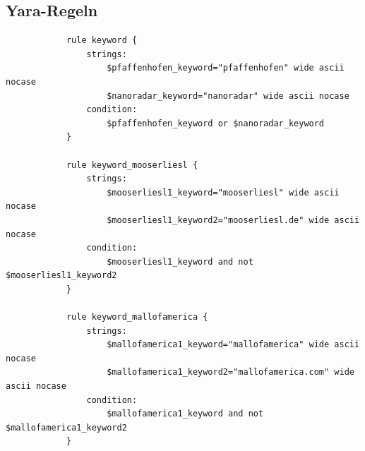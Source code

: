 
\begin{appendices}
		

%		

\renewcommand{\thesection}{\Alph{section}}

\begin{landscape}%
	\section{Yara-Regeln}
	\label{appendix:yara-regeln}
	\setcounter{page}{43}
	\vspace*{-0.5cm}
\begin{multicols}{2}
		\begin{verbatim}
			rule keyword {
				strings:
					$pfaffenhofen_keyword="pfaffenhofen" wide ascii nocase
					$nanoradar_keyword="nanoradar" wide ascii nocase	
				condition:
					$pfaffenhofen_keyword or $nanoradar_keyword 
			}
			
			rule keyword_mooserliesl {
				strings:
					$mooserliesl1_keyword="mooserliesl" wide ascii nocase
					$mooserliesl1_keyword2="mooserliesl.de" wide ascii nocase	
				condition:
					$mooserliesl1_keyword and not $mooserliesl1_keyword2
			}
			
			rule keyword_mallofamerica {
				strings:		
					$mallofamerica1_keyword="mallofamerica" wide ascii nocase
					$mallofamerica1_keyword2="mallofamerica.com" wide ascii nocase	
				condition:
					$mallofamerica1_keyword and not $mallofamerica1_keyword2
			}
			

\end{verbatim}
\end{multicols}
\end{landscape}
\end{appendices}
